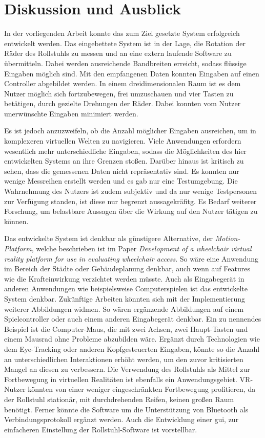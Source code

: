\chapter{Diskussion und Ausblick}
In der vorliegenden Arbeit konnte das zum Ziel gesetzte System erfolgreich entwickelt werden.
Das eingebettete System ist in der Lage, die Rotation der Räder des Rollstuhls zu messen und an eine extern laufende Software zu übermitteln.
Dabei werden ausreichende Bandbreiten erreicht, sodass flüssige Eingaben möglich sind.
Mit den empfangenen Daten konnten Eingaben auf einen Controller abgebildet werden.
In einem dreidimensionalen Raum ist es dem Nutzer möglich sich fortzubewegen, frei umzuschauen und vier Tasten zu betätigen, durch gezielte Drehungen der Räder.
Dabei konnten vom Nutzer unerwünschte Eingaben minimiert werden.

Es ist jedoch anzuzweifeln, ob die Anzahl möglicher Eingaben ausreichen, um in komplexeren virtuellen Welten zu navigieren.
Viele Anwendungen erfordern wesentlich mehr unterschiedliche Eingaben, sodass die Möglichkeiten des hier entwickelten Systems an ihre Grenzen stoßen.
Darüber hinaus ist kritisch zu sehen, dass die gemessenen Daten nicht repräsentativ sind.
Es konnten nur wenige Messreihen erstellt werden und es gab nur eine Testumgebung.
Die Wahrnehmung des Nutzers ist zudem subjektiv und da nur wenige Testpersonen zur Verfügung standen, ist diese nur begrenzt aussagekräfitg.
Es Bedarf weiterer Forschung, um belastbare Aussagen über die Wirkung auf den Nutzer tätigen zu können.

Das entwickelte System ist denkbar als günstigere Alternative, der \textit{Motion-Platform}, welche beschrieben ist im Paper \textit{Development of a wheelchair virtual reality platform for use in evaluating wheelchair access}\cite{harrisionDevelopmentWheelchairVirtual2000}.
So wäre eine Anwendung im Bereich der Städte oder Gebäudeplanung denkbar, auch wenn auf Features wie die Krafteinwirkung verzichtet werden müsste.
Auch als Eingabegerät in anderen Anwendungen wie beispielsweise Computerspielen ist das entwickelte System denkbar.
Zukünftige Arbeiten könnten sich mit der Implementierung weiterer Abbildungen widmen.
So wären ergänzende Abbildungen auf einem Spielcontroller oder auch einem anderen Eingabegerät denkbar.
Ein zu nennendes Beispiel ist die Computer-Maus, die mit zwei Achsen, zwei Haupt-Tasten und einem Mausrad ohne Probleme abzubilden wäre.
Ergänzt durch Technologien wie dem Eye-Tracking oder anderen Kopfgesteuerten Eingaben, könnte so die Anzahl an unterschiedlichen Interaktionen erhöht werden, um den zuvor kritisierten Mangel an diesen zu verbessern.
Die Verwendung des Rollstuhls als Mittel zur Fortbewegung in virtuellen Realitäten ist ebenfalls ein Anwendungsgebiet.
VR-Nutzer könnten von einer weniger eingeschränkten Fortbewegung profitieren, da der Rollstuhl stationär, mit durchdrehenden Reifen, keinen großen Raum benötigt.
Ferner könnte die Software um die Unterstützung von Bluetooth als Verbindungsprotokoll ergänzt werden.
Auch die Entwicklung einer \ac{gui}, zur einfacheren Einstellung der Rollstuhl-Software ist vorstellbar.